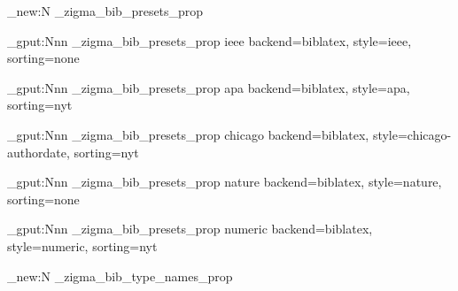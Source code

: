 \ExplSyntaxOn


\prop_new:N \g_zigma_bib_presets_prop

\prop_gput:Nnn \g_zigma_bib_presets_prop { ieee }
  { backend=biblatex, style=ieee, sorting=none }

\prop_gput:Nnn \g_zigma_bib_presets_prop { apa }
  { backend=biblatex, style=apa, sorting=nyt }

\prop_gput:Nnn \g_zigma_bib_presets_prop { chicago }
  { backend=biblatex, style=chicago-authordate, sorting=nyt }

\prop_gput:Nnn \g_zigma_bib_presets_prop { nature }
  { backend=biblatex, style=nature, sorting=none }

\prop_gput:Nnn \g_zigma_bib_presets_prop { numeric }
  { backend=biblatex, style=numeric, sorting=nyt }


\prop_new:N \g_zigma_bib_type_names_prop


